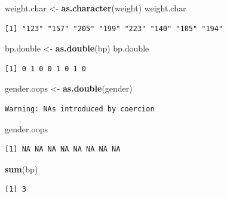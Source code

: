 \documentclass[
]{krantz}
\makeatletter
\newenvironment{Shaded}{\begin{snugshade}}{\end{snugshade}}
\newcommand{\KeywordTok}[1]{\textcolor[rgb]{0.27,0.27,0.27}{\textbf{#1}}}
\newcommand{\NormalTok}[1]{#1}
\newcommand{\StringTok}[1]{\textcolor[rgb]{0.5,0.5,0.5}{#1}}
\newenvironment{kframe}{%
\medskip{}
\setlength{\fboxsep}{.8em}
 \def\at@end@of@kframe{}%
 \ifinner\ifhmode%
  \def\at@end@of@kframe{\end{minipage}}%
  \begin{minipage}{\columnwidth}%
 \fi\fi%
 \def\FrameCommand##1{\hskip\@totalleftmargin \hskip-\fboxsep
 \colorbox{shadecolor}{##1}\hskip-\fboxsep
     \hskip-\linewidth \hskip-\@totalleftmargin \hskip\columnwidth}%
 \MakeFramed {\advance\hsize-\width
   \@totalleftmargin\z@ \linewidth\hsize
   \@setminipage}}%
 {\par\unskip\endMakeFramed%
 \at@end@of@kframe}
\renewenvironment{Shaded}{\begin{kframe}}{\end{kframe}}
\makeatother
\begin{document}
\begin{Shaded}
\begin{Highlighting}[]
\NormalTok{weight.char \textless{}{-}}\StringTok{ }\KeywordTok{as.character}\NormalTok{(weight)}
\NormalTok{weight.char}
\end{Highlighting}
\end{Shaded}

\begin{verbatim}
[1] "123" "157" "205" "199" "223" "140" "105" "194"
\end{verbatim}

\begin{Shaded}
\begin{Highlighting}[]
\NormalTok{bp.double \textless{}{-}}\StringTok{ }\KeywordTok{as.double}\NormalTok{(bp)}
\NormalTok{bp.double}
\end{Highlighting}
\end{Shaded}

\begin{verbatim}
[1] 0 1 0 0 1 0 1 0
\end{verbatim}

\begin{Shaded}
\begin{Highlighting}[]
\NormalTok{gender.oops \textless{}{-}}\StringTok{ }\KeywordTok{as.double}\NormalTok{(gender)}
\end{Highlighting}
\end{Shaded}

\begin{verbatim}
Warning: NAs introduced by coercion
\end{verbatim}

\begin{Shaded}
\begin{Highlighting}[]
\NormalTok{gender.oops}
\end{Highlighting}
\end{Shaded}

\begin{verbatim}
[1] NA NA NA NA NA NA NA NA
\end{verbatim}

\begin{Shaded}
\begin{Highlighting}[]
\KeywordTok{sum}\NormalTok{(bp)}
\end{Highlighting}
\end{Shaded}

\begin{verbatim}
[1] 3
\end{verbatim}
\end{document}
